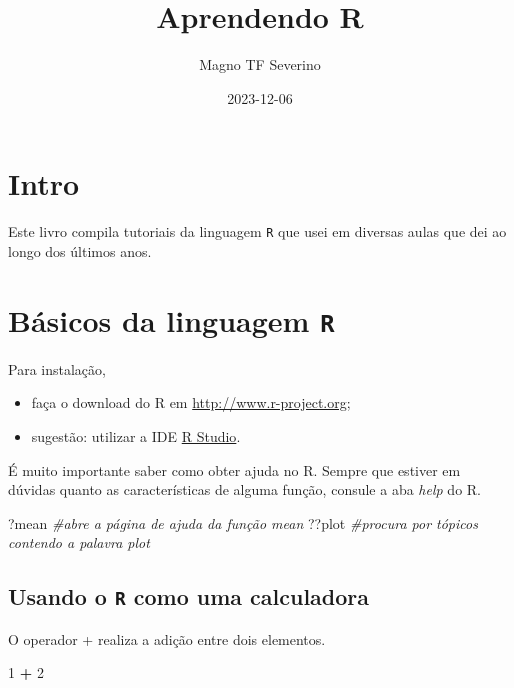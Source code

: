 \documentclass[
]{book}
\title{Aprendendo R}
\author{Magno TF Severino}
\date{2023-12-06}
\newenvironment{Shaded}{\begin{snugshade}}{\end{snugshade}}
\newcommand{\CommentTok}[1]{\textcolor[rgb]{0.56,0.35,0.01}{\textit{#1}}}
\newcommand{\DecValTok}[1]{\textcolor[rgb]{0.00,0.00,0.81}{#1}}
\newcommand{\NormalTok}[1]{#1}
\newcommand{\SpecialCharTok}[1]{\textcolor[rgb]{0.81,0.36,0.00}{\textbf{#1}}}
\begin{document}
\maketitle

{
\setcounter{tocdepth}{1}
\tableofcontents
}
\chapter{Intro}\label{intro}

Este livro compila tutoriais da linguagem \texttt{R} que usei em diversas aulas que dei ao longo dos últimos anos.

\chapter{\texorpdfstring{Básicos da linguagem \texttt{R}}{Básicos da linguagem R}}\label{buxe1sicos-da-linguagem-r}

Para instalação,

\begin{itemize}
\item
  faça o download do R em \url{http://www.r-project.org};
\item
  sugestão: utilizar a IDE \href{http://www.rstudio.org}{R Studio}.
\end{itemize}

É muito importante saber como obter ajuda no R.
Sempre que estiver em dúvidas quanto as características de alguma função, consule a aba \emph{help} do R.

\begin{Shaded}
\begin{Highlighting}[]
\NormalTok{?mean }\CommentTok{\#abre a página de ajuda da função \textquotesingle{}mean\textquotesingle{}}
\NormalTok{??plot }\CommentTok{\#procura por tópicos contendo a palavra \textquotesingle{}plot\textquotesingle{}}
\end{Highlighting}
\end{Shaded}

\section{\texorpdfstring{Usando o \texttt{R} como uma calculadora}{Usando o R como uma calculadora}}\label{usando-o-r-como-uma-calculadora}

O operador + realiza a adição entre dois elementos.

\begin{Shaded}
\begin{Highlighting}[]
\DecValTok{1} \SpecialCharTok{+} \DecValTok{2}
\end{Highlighting}
\end{Shaded}
\end{document}
